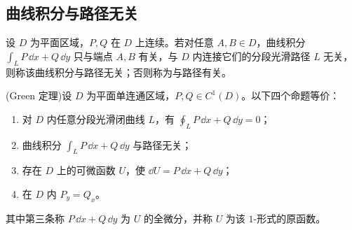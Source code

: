 \subsection*{曲线积分与路径无关}
\begin{definition}
设 $D$ 为平面区域，$P,Q$ 在 $D$ 上连续。若对任意 $A,B\in D$，曲线积分 $\displaystyle \int_LP\,\dd x+Q\,\dd y$ 只与端点 $A,B$ 有关，与 $D$ 内连接它们的分段光滑路径 $L$ 无关，则称该曲线积分与路径无关；否则称为与路径有关。
\end{definition}
\begin{theorem}[Green 定理]
(Green 定理)设 $D$ 为平面单连通区域，$P,Q\in C^1(D)$。以下四个命题等价：
\begin{enumerate}
\item 对 $D$ 内任意分段光滑闭曲线 $L$，有 $\displaystyle\oint_LP\,\dd x+Q\,\dd y=0$；
\item 曲线积分 $\displaystyle\int_LP\,\dd x+Q\,\dd y$ 与路径无关；
\item 存在 $D$ 上的可微函数 $U$，使 $\dd U=P\,\dd x+Q\,\dd y$；
\item 在 $D$ 内 $P_y=Q_x$。
\end{enumerate}
其中第三条称 $P\,\dd x+Q\,\dd y$ 为 $U$ 的全微分，并称 $U$ 为该 $1$-形式的原函数。
\end{theorem}
